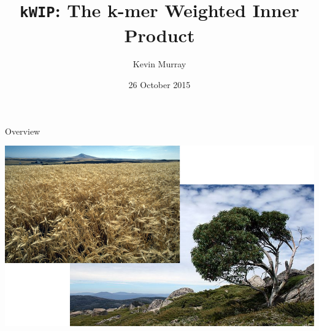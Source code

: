 \documentclass[t]{beamer}
\title{\texttt{kWIP}: The k-mer Weighted Inner Product}
\author{Kevin Murray}
\institute{PhD Candidate, Borevitz Lab, CPEB, ANU}
\date{26 October 2015}
\begin{document}
{
\begin{frame}
  \titlepage
  \vfill
\end{frame}
}

\begin{frame}{Overview}
  \begin{center}
    \includegraphics[width=\textwidth]{img/overview.png}
  \end{center}
\end{frame}
\end{document}
